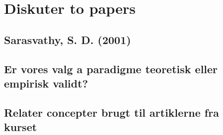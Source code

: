 \documentclass[a4paper]{article}
\begin{document}









\label{paradigme}


\section{Diskuter to papers}

\subsection{Sarasvathy, S. D. (2001)}


\subsection{Er vores valg a paradigme teoretisk eller empirisk validt?}
\subsection{Relater concepter brugt til artiklerne fra kurset}




\printbibliography[heading=bibintoc]
\end{document}
